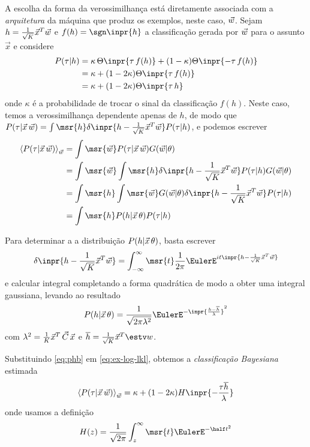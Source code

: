 \newcommand{\outf}[1]{\ensuremath{\sgn\inpr{#1}}}
\newcommand{\hfunc}[1]{\ensuremath{\frac{1}{\sqrt{K}}\vec{x}^T#1}}
\newcommand{\hrl}{\ensuremath{\hfunc{\rl}}}
\newcommand{\htfunc}{\ensuremath{\hfunc{\wt}}}
\newcommand{\htv}{\ensuremath{\overline{h}}}
\newcommand{\ns}{\ensuremath{\kappa}} A escolha da forma da verossimilhança está
diretamente associada com a \emph{arquitetura} da máquina que produz os
exemplos, neste caso, $\vec{w}$.  Sejam $h = \hrl$ e $f(h) = \outf{h}$ a
classificação gerada por $\vec{w}$ para o assunto $\vec{x}$ e considere
\begin{align}\label{eq:veros}
    P(\tau|h) & = \ns\,\Theta\inpr{\tau\,f(h)} + (1-\ns)\Theta\inpr{-\tau\,f(h)} \notag \\
    & = \ns + (1-2\ns)\Theta\inpr{\tau\,f(h)} \notag \\
    & = \ns + (1-2\ns)\Theta\inpr{\tau\,h}
\end{align}
onde $\ns$ é a probabilidade de trocar o sinal da classificação $f(h)$.  Neste
caso, temos a verossimilhança dependente apenas de $h$, de modo que
$P(\tau|\vec{x}\,\rl) = \int\msr{h}\delta\inpr{h-\hrl}P(\tau|h)$, e podemos
escrever
\begin{align}\label{eq:ex-log-lkl}
   \Ex{\lkl}_{\rl}& = \int\msr{\rl}\lkl\gt \notag \\
   & = \int\msr{\rl}\int\msr{h}\delta\inpr{h-\hrl}P(\tau|h)\gt \notag \\
   & = \int\msr{h}\int\msr{\rl}\gt\delta\inpr{h-\hrl}P(\tau|h) \notag \\
   & = \int\msr{h}P(h|\vec{x}\,\At)P(\tau|h)
\end{align}

\newcommand{\varh}{\ensuremath{\lambda}}
Para determinar a a distribuição $P(h|\vec{x}\,\theta)$, basta escrever
\[
    \delta\inpr{h-\hrl} = \int^{\infty}_{-\infty}\msr{t}\frac{1}{2\pi}\EulerE^{it\inpr{h-\hrl}}
\]
e calcular integral completando a forma quadrática de modo a obter uma integral
gaussiana, levando ao resultado
\begin{align}\label{eq:phb}
    P(h|\vec{x}\,\At) = \frac{1}{\sqrt{2\pi \varh^2}} \EulerE^{-\inpr{\frac{h-\htv}{\varh}}^2}
\end{align}
com $\varh^2=\frac{1}{K}\vec{x}^T\,\Ct\,\vec{x}$ e $\htv = \htfunc$.

Substituindo \eqref{eq:phb} em \eqref{eq:ex-log-lkl}, obtemos a
\emph{classificação Bayesiana} estimada
\begin{align}\label{eq:bayes-cls}
    \Ex{\lkl}_{\rl} = \ns + (1-2\ns)H\inpr{-\frac{\tau\htv}{\varh}}
\end{align}
onde usamos a definição  \[H(z)=\frac{1}{\sqrt{2\pi}}\int^{\infty}_z\msr{t}\EulerE^{-\half t^2}\]

